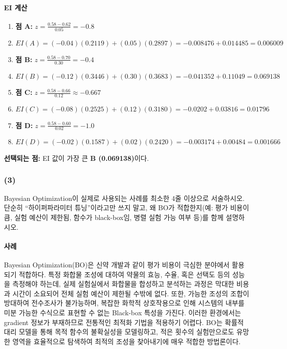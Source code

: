 \documentclass[11pt]{article}
\begin{document}
\paragraph{EI 계산}
\begin{enumerate}
  \item \textbf{점 A:} $z = \frac{0.58 - 0.62}{0.05} = -0.8$ 
  \item[] $EI(A) = (-0.04)(0.2119) + (0.05)(0.2897) = -0.008476 + 0.014485 = \mathbf{0.006009}$
  
  \item \textbf{점 B:} $z = \frac{0.58 - 0.70}{0.30} = -0.4$
  \item[] $EI(B) = (-0.12)(0.3446) + (0.30)(0.3683) = -0.041352 + 0.11049 = \mathbf{0.069138}$
  
  \item \textbf{점 C:} $z = \frac{0.58 - 0.66}{0.12} \approx -0.667$
  \item[] $EI(C) = (-0.08)(0.2525) + (0.12)(0.3180) = -0.0202 + 0.03816 = \mathbf{0.01796}$
  
  \item \textbf{점 D:} $z = \frac{0.58 - 0.60}{0.02} = -1.0$
  \item[] $EI(D) = (-0.02)(0.1587) + (0.02)(0.2420) = -0.003174 + 0.00484 = \mathbf{0.001666}$
\end{enumerate}

\noindent \textbf{선택되는 점:} EI 값이 가장 큰 \textbf{B (0.069138)}이다.

\subsubsection*{(3)} 
Bayesian Optimization이 실제로 사용되는 사례를 최소한 4줄 이상으로 서술하시오. 단순히 “하이퍼파라미터 튜닝”이라고만 쓰지 말고, 왜 BO가 적합한지(예: 평가 비용이 큼, 실험 예산이 제한됨, 함수가 black-box임, 병렬 실험 가능 여부 등)를 함께 설명하시오.
\paragraph{사례}
Bayesian Optimization(BO)은 신약 개발과 같이 평가 비용이 극심한 분야에서 활용되기 적합하다. 특정 화합물 조성에 대하여 약물의 효능, 수율, 혹은 선택도 등의 성능을 측정해야 하는데, 실제 실험실에서 화합물을 합성하고 분석하는 과정은 막대한 비용과 시간이 소요되어 전체 실험 예산이 제한될 수밖에 없다. 또한, 가능한 조성의 조합이 방대하여 전수조사가 불가능하며, 복잡한 화학적 상호작용으로 인해 시스템의 내부를 미분 가능한 수식으로 표현할 수 없는 Black-box 특성을 가진다. 이러한 환경에서는 gradient 정보가 부재하므로 전통적인 최적화 기법을 적용하기 어렵다. BO는 확률적 대리 모델을 통해 목적 함수의 불확실성을 모델링하고, 적은 횟수의 실험만으로도 유망한 영역을 효율적으로 탐색하여 최적의 조성을 찾아내기에 매우 적합한 방법론이다.
\end{document}
